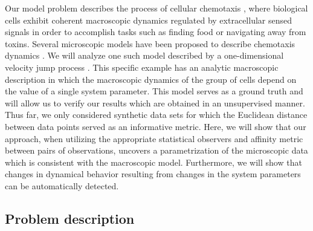 Our model problem describes the process of cellular chemotaxis \cite{othmer2000diffusion}, where biological cells exhibit coherent macroscopic dynamics regulated by extracellular sensed signals in order to accomplish tasks such as finding food or navigating away from toxins.
%
Several microscopic models have been proposed to describe chemotaxis dynamics \cite{othmer1988models, codling2008random}.
%
We will analyze one such model described by a one-dimensional velocity jump process \cite{othmer2000diffusion}.
%
This specific example has an analytic macroscopic description in which the macroscopic dynamics of the group of cells depend on the value of a single system parameter.
%
This model serves as a ground truth and will allow us to verify our results which are obtained in an unsupervised manner.
%
Thus far, we only considered synthetic data sets for which the Euclidean distance between data points served as an informative metric.
%
Here, we will show that our approach, when utilizing the appropriate statistical observers and affinity metric between pairs of observations, uncovers a parametrization of the microscopic data which is consistent with the macroscopic model.
%
Furthermore, we will show that changes in dynamical behavior resulting from changes in the system parameters can be automatically detected.

\subsection{Problem description}

